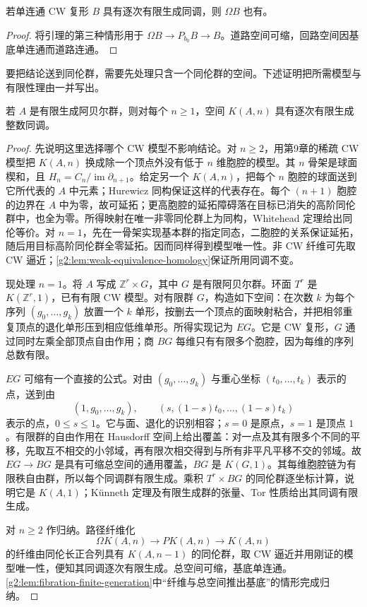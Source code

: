 \begin{corollary}\label{g2:cor:loop-finite-generation}
	若单连通 CW 复形 \(B\) 具有逐次有限生成同调，则 \(\Omega B\) 也有。
\end{corollary}
\begin{proof}
	将引理的第三种情形用于 \(\Omega B\to P_{b_0}B\to B\)。道路空间可缩，回路空间因基底单连通而道路连通。
\end{proof}

要把结论送到同伦群，需要先处理只含一个同伦群的空间。下述证明把所需模型与有限性理由一并写出。

\begin{lemma}\label{g2:lem:em-space-finite-generation}
	若 \(A\) 是有限生成阿贝尔群，则对每个 \(n\ge1\)，空间 \(K(A,n)\) 具有逐次有限生成整数同调。
\end{lemma}
\begin{proof}
	先说明这里选择哪个 CW 模型不影响结论。对 \(n\ge2\)，用第9章的稀疏 CW 模型把 \(K(A,n)\) 换成除一个顶点外没有低于 \(n\) 维胞腔的模型。其 \(n\) 骨架是球面楔和，且 \(H_n=C_n/\operatorname{im}\partial_{n+1}\)。给定另一个 \(K(A,n)\)，把每个 \(n\) 胞腔的球面送到它所代表的 \(A\) 中元素；Hurewicz 同构保证这样的代表存在。每个 \((n+1)\) 胞腔的边界在 \(A\) 中为零，故可延拓；更高胞腔的延拓障碍落在目标已消失的高阶同伦群中，也全为零。所得映射在唯一非零同伦群上为同构，Whitehead 定理给出同伦等价。对 \(n=1\)，先在一骨架实现基本群的指定同态，二胞腔的关系保证延拓，随后用目标高阶同伦群全零延拓。因而同样得到模型唯一性。非 CW 纤维可先取 CW 逼近；\cref{g2:lem:weak-equivalence-homology}保证所用同调不变。

	现处理 \(n=1\)。将 \(A\) 写成 \(\mathbb Z^r\times G\)，其中 \(G\) 是有限阿贝尔群。环面 \(T^r\) 是 \(K(\mathbb Z^r,1)\)，已有有限 CW 模型。对有限群 \(G\)，构造如下空间：在次数 \(k\) 为每个序列 \((g_0,\ldots,g_k)\) 放置一个 \(k\) 单形，按删去一个顶点的面映射粘合，并把相邻重复顶点的退化单形压到相应低维单形。所得实现记为 \(EG\)。它是 CW 复形，\(G\) 通过同时左乘全部顶点自由作用；商 \(BG\) 每维只有有限多个胞腔，因为每维的序列总数有限。

	\(EG\) 可缩有一个直接的公式。对由 \((g_0,\ldots,g_k)\) 与重心坐标 \((t_0,\ldots,t_k)\) 表示的点，送到由
	\[
		(1,g_0,\ldots,g_k),\qquad (s,(1-s)t_0,\ldots,(1-s)t_k)
	\]
	表示的点，\(0\le s\le1\)。它与面、退化的识别相容；\(s=0\) 是原点，\(s=1\) 是顶点 \(1\)。有限群的自由作用在 Hausdorff 空间上给出覆盖：对一点及其有限多个不同的平移，先取互不相交的小邻域，再有限次相交得到与所有非平凡平移不交的邻域。故 \(EG\to BG\) 是具有可缩总空间的通用覆盖，\(BG\) 是 \(K(G,1)\)。其每维胞腔链为有限秩自由群，所以每个同调群有限生成。乘积 \(T^r\times BG\) 的同伦群逐坐标计算，说明它是 \(K(A,1)\)；Künneth 定理及有限生成群的张量、Tor 性质给出其同调有限生成。

	对 \(n\ge2\) 作归纳。路径纤维化
	\[
		\Omega K(A,n)\longrightarrow P K(A,n)\longrightarrow K(A,n)
	\]
	的纤维由同伦长正合列具有 \(K(A,n-1)\) 的同伦群，取 CW 逼近并用刚证的模型唯一性，便知其同调逐次有限生成。总空间可缩，基底单连通。\cref{g2:lem:fibration-finite-generation}中“纤维与总空间推出基底”的情形完成归纳。
\end{proof}

